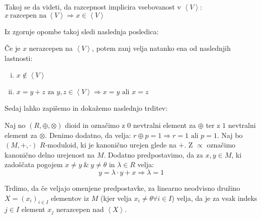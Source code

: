 \documentclass[mat1]{fmfdelo}
\newcommand{\Gen}[1]{\ensuremath{\left<{#1}\right>}}
\begin{document}
\begin{opomba}
	Takoj se da videti, da razcepnost implicira vsebovanost v \Gen{V}: $x~\text{razcepen na}~ \Gen{V}\Rightarrow x\in \Gen{V}$
\end{opomba}

Iz zgornje opombe takoj sledi naslednja posledica:
\begin{posledica}
	\label{pos:nerazcep}
	Če je $x$ nerazcepen na \Gen{V}, potem zanj velja natanko ena od naslednjih lastnosti:
	\begin{enumerate}[(i)] 
		\item $x \notin \Gen{V}$
		\item $x = y + z \text{~za~} y, z\in\Gen{V}\Rightarrow x = y \text{~ali~} x = z$
	\end{enumerate}
\end{posledica}

Sedaj lahko zapišemo in dokažemo naslednjo trditev:
\begin{trditev}
	\label{trd:potrebzanerazcep}
	Naj no $(R, \oplus, \otimes)$ dioid in označimo z $0$ nevtralni element za $\oplus$ ter z $1$ nevtralni element za $\otimes$. Denimo dodatno, da velja: $r\oplus p = 1 \Rightarrow r = 1 \text{~ali~} p=1$. 
	Naj bo $(M, +, \cdot)$ $R$-moduloid, ki je kanonično urejen glede na $+$. Z $\varpropto$ označimo kanonično delno urejenost na $M$. Dodatno predpostavimo, da za $x, y\in M$, ki zadoščata pogojem $x \neq y ~\&~ y\neq\theta$ in $\lambda\in R$ velja: $$y = \lambda\cdot y + x \Rightarrow \lambda = 1$$
	
	Trdimo, da če veljajo omenjene predpostavke, za linearno neodvisno družino \newline $X = (x_i)_{i\in I}$ elementov iz $M$ (kjer velja $x_i \neq \theta \forall i\in I$) velja, da je za vsak indeks $j\in I$ element $x_j$ nerazcepen nad \Gen{X}.
\end{trditev}
\end{document}
